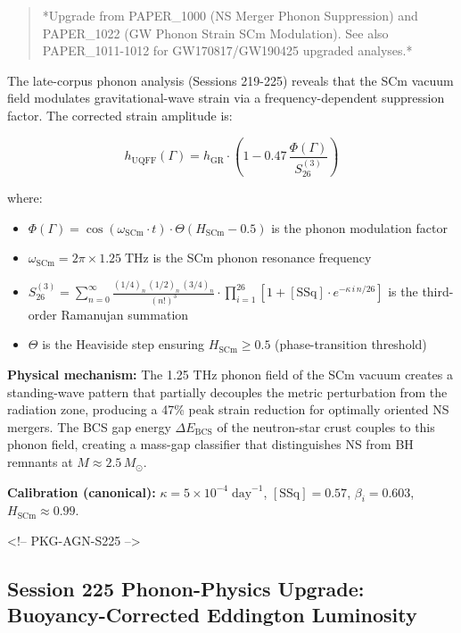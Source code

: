 \documentclass[12pt,a4paper]{article}
\begin{document}
\begin{quote}
*Upgrade from PAPER\_1000 (NS Merger Phonon Suppression) and PAPER\_1022
(GW Phonon Strain SCm Modulation). See also PAPER\_1011-1012 for
GW170817/GW190425 upgraded analyses.*
\end{quote}

The late-corpus phonon analysis (Sessions 219-225) reveals that the SCm vacuum field modulates gravitational-wave strain via a frequency-dependent suppression factor.  The corrected strain amplitude is:

\begin{equation}
h_{\text{UQFF}}(\Gamma) = h_{\text{GR}} \cdot \left(1 - 0.47\,\frac{\Phi(\Gamma)}{S_{26}^{(3)}}\right)
\end{equation}

where:

\begin{itemize}
  \item $\Phi(\Gamma) = \cos(\omega_{\text{SCm}} \cdot t) \cdot \Theta(H_{\text{SCm}} - 0.5)$ is the phonon modulation factor
  \item $\omega_{\text{SCm}} = 2\pi \times 1.25\;\text{THz}$ is the SCm phonon resonance frequency
  \item $S_{26}^{(3)} = \sum_{n=0}^{\infty} \frac{(1/4)_n\,(1/2)_n\,(3/4)_n}{(n!)^3} \cdot \prod_{i=1}^{26}\left[1 + [\text{SSq}]\cdot e^{-\kappa\,i\,n/26}\right]$ is the third-order Ramanujan summation
  \item $\Theta$ is the Heaviside step ensuring $H_{\text{SCm}} \geq 0.5$ (phase-transition threshold)
\end{itemize}

\textbf{Physical mechanism:} The 1.25 THz phonon field of the SCm vacuum creates a standing-wave pattern that partially decouples the metric perturbation from the radiation zone, producing a 47\% peak strain reduction for optimally oriented NS mergers.  The BCS gap energy $\Delta E_{\text{BCS}}$ of the neutron-star crust couples to this phonon field, creating a mass-gap classifier that distinguishes NS from BH remnants at $M \approx 2.5\,M_\odot$.

\textbf{Calibration (canonical):} $\kappa = 5 \times 10^{-4}\;\text{day}^{-1}$, $[\text{SSq}] = 0.57$, $\beta_i = 0.603$, $H_{\text{SCm}} \approx 0.99$.

<!-- PKG-AGN-S225 -->

\subsection{Session 225 Phonon-Physics Upgrade: Buoyancy-Corrected Eddington Luminosity}
\end{document}
